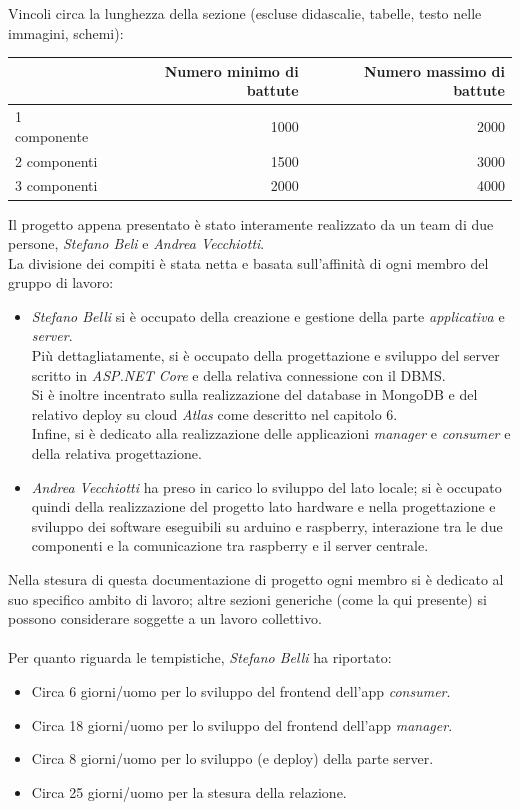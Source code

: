 \documentclass[12pt]{article}
\begin{document}
Vincoli circa la lunghezza della sezione (escluse didascalie, tabelle, testo nelle immagini, schemi):

\vspace{1cm}
\begin{tabular}{l|rr}
 & Numero minimo di battute & Numero massimo di battute \\
 \hline
 1 componente & 1000 & 2000 \\
 2 componenti & 1500 & 3000 \\
 3 componenti & 2000 & 4000 \\
 \hline
\end{tabular}

\newpage

Il progetto appena presentato è stato interamente realizzato da un team di due persone, \textit{Stefano Beli} e \textit{Andrea Vecchiotti}.\\
La divisione dei compiti è stata netta e basata sull'affinità di ogni membro del gruppo di lavoro:
\begin{itemize}
	\item \textit{Stefano Belli} si è occupato della creazione e gestione della parte \textit{applicativa} e \textit{server}.\\
	Più dettagliatamente, si è occupato della progettazione e sviluppo del server scritto in \textit{ASP.NET Core} e della relativa connessione con il DBMS.\\
	Si è inoltre incentrato sulla realizzazione del database in MongoDB e del relativo deploy su cloud \textit{Atlas} come descritto nel capitolo 6.\\
	Infine, si è dedicato alla realizzazione delle applicazioni \textit{manager} e \textit{consumer} e della relativa progettazione.
	\item \textit{Andrea Vecchiotti} ha preso in carico lo sviluppo del lato locale; si è occupato quindi della realizzazione del progetto lato hardware e nella progettazione e sviluppo dei software eseguibili su arduino e raspberry, interazione tra le due componenti e la comunicazione tra raspberry e il server centrale.
\end{itemize}
Nella stesura di questa documentazione di progetto ogni membro si è dedicato al suo specifico ambito di lavoro; altre sezioni generiche (come la qui presente) si possono considerare soggette a un lavoro collettivo.\\\\
Per quanto riguarda le tempistiche, \textit{Stefano Belli}  ha riportato:
\begin{itemize}
\item Circa 6 giorni/uomo per lo sviluppo del frontend dell'app \textit{consumer}.
\item Circa 18 giorni/uomo per lo sviluppo del frontend dell'app \textit{manager}.
\item Circa 8 giorni/uomo per lo sviluppo (e deploy) della parte server.
\item Circa 25 giorni/uomo per la stesura della relazione.
\end{itemize}
\end{document}
